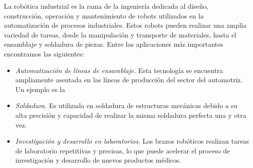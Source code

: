 La robótica industrial es la rama de la ingeniería dedicada al diseño, construcción, operación y mantenimiento 
de robots utilizados en la automatización de procesos industriales. Estos robots pueden realizar una amplia variedad 
de tareas, desde la manipulación y transporte de materiales, hasta el ensamblaje y soldadura de piezas. Entre las aplicaciones 
más importantes encontramos las siguientes:

\begin{itemize}
  \item \textit{Automatización de líneas de ensamblaje.} Esta tecnología se encuentra ampliamente asentada en las líneas de  producción 
                                                        del sector del automotriz. Un ejemplo es la 
  \item \textit{Soldadura.} Es utilizada en soldadura de estructuras mecánicas debido a su alta precisión y capacidad de realizar 
                            la misma soldadura perfecta una y otra vez.
  \item \textit{Investigación y desarrollo en laboratorios.} Los brazos robóticos realizan tareas de laboratorio repetitivas y precisas, 
                              lo que puede acelerar el proceso de investigación y desarrollo de nuevos productos médicos.
 \end{itemize}\

